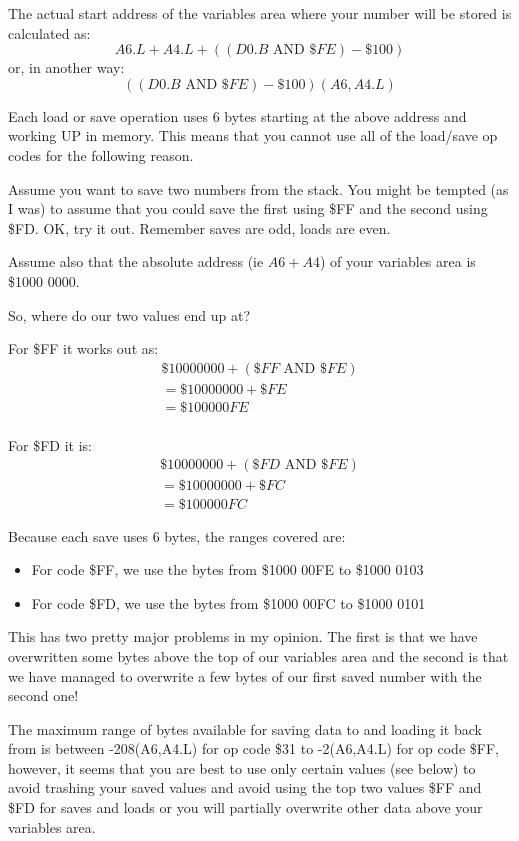 The actual start address of the variables area where your number
    will be stored is calculated as:$$A6.L + A4.L + ((D0.B \text{ AND } \$FE) -\$100)$$ or, in another way: $$((D0.B \text{ AND } \$FE) -\$100)(A6,A4.L)$$

Each load or save operation uses 6 bytes starting at the above
    address and working UP in memory. This means that you cannot use all of
    the load/save op codes for the following reason.

Assume you want to save two numbers from the stack. You might be
    tempted (as I was) to assume that you could save the first using \$FF and
    the second using \$FD. OK, try it out. Remember saves are odd, loads are
    even.

Assume also that the absolute address (ie $A6 + A4$) of your variables
    area is \$1000 0000.

So, where do our two values end up at?

For \$FF it works out as:
$$
\begin{array}{l}
  \$1000 0000 + (\$FF \text{ AND } \$FE) \\
= \$1000 0000 + \$FE \\ 
= \$1000 00FE \\
\end{array}
$$

For \$FD it is: 
$$
\begin{array}{l}
  \$1000 0000 + (\$FD \text{ AND } \$FE) \\
= \$1000 0000 + \$FC \\
= \$1000 00FC
\end{array}
$$


Because each save uses 6 bytes, the ranges covered are:
\begin{itemize}[itemsep=0pt]

\item{}For code \$FF, we use the bytes from \$1000 00FE to \$1000 0103

\item{}For code \$FD, we use the bytes from \$1000 00FC to \$1000 0101

\end{itemize}

This has two pretty major problems in my opinion. The first is that
    we have overwritten some bytes above the top of our variables area and the
    second is that we have managed to overwrite a few bytes of our first saved
    number with the second one!

The maximum range of bytes available for saving data to and loading
    it back from is between -{}208(A6,A4.L) for op code \$31 to -{}2(A6,A4.L) for
    op code \$FF, however, it seems that you are best to use only certain
    values (see below) to avoid trashing your saved values and avoid using the
    top two values \$FF and \$FD for saves and loads or you will partially
    overwrite other data above your variables area.

